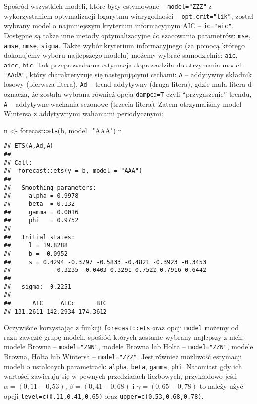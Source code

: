 \documentclass[polish,]{book}
\newenvironment{Shaded}{\begin{snugshade}}{\end{snugshade}}
\newcommand{\DataTypeTok}[1]{\textcolor[rgb]{0.13,0.29,0.53}{#1}}
\newcommand{\KeywordTok}[1]{\textcolor[rgb]{0.13,0.29,0.53}{\textbf{#1}}}
\newcommand{\NormalTok}[1]{#1}
\newcommand{\OperatorTok}[1]{\textcolor[rgb]{0.81,0.36,0.00}{\textbf{#1}}}
\newcommand{\StringTok}[1]{\textcolor[rgb]{0.31,0.60,0.02}{#1}}
\begin{document}
Spośród wszystkich modeli, które były estymowane -- \texttt{model="ZZZ"} z wykorzystaniem optymalizacji logarytmu wiarygodności -- \texttt{opt.crit="lik"}, został wybrany
model o najmniejszym kryterium informacyjnym AIC -- \texttt{ic="aic"}. Dostępne są
także inne metody optymalizacyjne do szacowania parametrów: \texttt{mse}, \texttt{amse}, \texttt{nmse},
\texttt{sigma}. Także wybór kryterium informacyjnego (za pomocą którego dokonujemy
wyboru najlepszego modelu) możemy wybrać samodzielnie: \texttt{aic}, \texttt{aicc}, \texttt{bic}. Tak
przeprowadzona estymacja doprowadziła do otrzymania modelu \texttt{"AAdA"}, który charakteryzuje się następującymi cechami: \texttt{A} -- addytywny składnik losowy (pierwsza
litera), \texttt{Ad} -- trend addytywny (druga litera), gdzie mała litera d oznacza, że została wybrana również opcja \texttt{damped=T} czyli ``przygaszenie'' trendu, \texttt{A} -- addytywne
wachania sezonowe (trzecia litera). Zatem otrzymaliśmy model Wintersa z addytywnymi wahaniami periodycznymi:

\begin{Shaded}
\begin{Highlighting}[]
\NormalTok{n <-}\StringTok{ }\NormalTok{forecast}\OperatorTok{::}\KeywordTok{ets}\NormalTok{(b, }\DataTypeTok{model=}\StringTok{"AAA"}\NormalTok{)}
\NormalTok{n}
\end{Highlighting}
\end{Shaded}

\begin{verbatim}
## ETS(A,Ad,A) 
## 
## Call:
##  forecast::ets(y = b, model = "AAA") 
## 
##   Smoothing parameters:
##     alpha = 0.9978 
##     beta  = 0.132 
##     gamma = 0.0016 
##     phi   = 0.9752 
## 
##   Initial states:
##     l = 19.8288 
##     b = -0.0952 
##     s = 0.0294 -0.3797 -0.5833 -0.4821 -0.3923 -0.3453
##            -0.3235 -0.0403 0.3291 0.7522 0.7916 0.6442
## 
##   sigma:  0.2251
## 
##      AIC     AICc      BIC 
## 131.2611 142.2934 174.3612
\end{verbatim}

Oczywiście korzystając z funkcji \href{https://rdrr.io/cran/forecast/man/ets.html}{\texttt{forecast::ets}} oraz opcji \texttt{model} możemy od razu zawęzić
grupę modeli, spośród których zostanie wybrany najlepszy z nich: modele Browna
-- \texttt{model="ZNN"}, modele Browna lub Holta -- \texttt{model="ZZN"}, modele Browna, Holta
lub Wintersa -- \texttt{model="ZZZ"}. Jest również możliwość estymacji modeli o ustalonych
parametrach: \texttt{alpha}, \texttt{beta}, \texttt{gamma}, \texttt{phi}. Natomiast gdy ich wartości zawierają się
w pewnych przedziałach liczbowych, przykładowo jeśli \(\alpha = (0,11 - 0,53)\), \(\beta = (0,41 - 0,68)\) i \(\gamma = (0,65 - 0,78)\) to należy użyć opcji \texttt{level=c(0.11,0.41,0.65)} oraz \texttt{upper=c(0.53,0.68,0.78)}.
\end{document}

